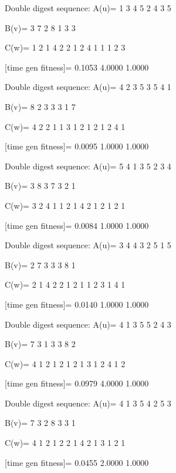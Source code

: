 Double digest sequence:
A(u)=
     1     3     4     5     2     4     3     5

B(v)=
     3     7     2     8     1     3     3

C(w)=
     1     2     1     4     2     2     1     2     4     1     1     1     2     3

[time gen fitness]=
    0.1053    4.0000    1.0000

Double digest sequence:
A(u)=
     4     2     3     5     3     5     4     1

B(v)=
     8     2     3     3     3     1     7

C(w)=
     4     2     2     1     1     3     1     2     1     2     1     2     4     1

[time gen fitness]=
    0.0095    1.0000    1.0000

Double digest sequence:
A(u)=
     5     4     1     3     5     2     3     4

B(v)=
     3     8     3     7     3     2     1

C(w)=
     3     2     4     1     1     2     1     4     2     1     2     1     2     1

[time gen fitness]=
    0.0084    1.0000    1.0000

Double digest sequence:
A(u)=
     3     4     4     3     2     5     1     5

B(v)=
     2     7     3     3     3     8     1

C(w)=
     2     1     4     2     2     1     2     1     1     2     3     1     4     1

[time gen fitness]=
    0.0140    1.0000    1.0000

Double digest sequence:
A(u)=
     4     1     3     5     5     2     4     3

B(v)=
     7     3     1     3     3     8     2

C(w)=
     4     1     2     1     2     1     2     1     3     1     2     4     1     2

[time gen fitness]=
    0.0979    4.0000    1.0000

Double digest sequence:
A(u)=
     4     1     3     5     4     2     5     3

B(v)=
     7     3     2     8     3     3     1

C(w)=
     4     1     2     1     2     2     1     4     2     1     3     1     2     1

[time gen fitness]=
    0.0455    2.0000    1.0000

